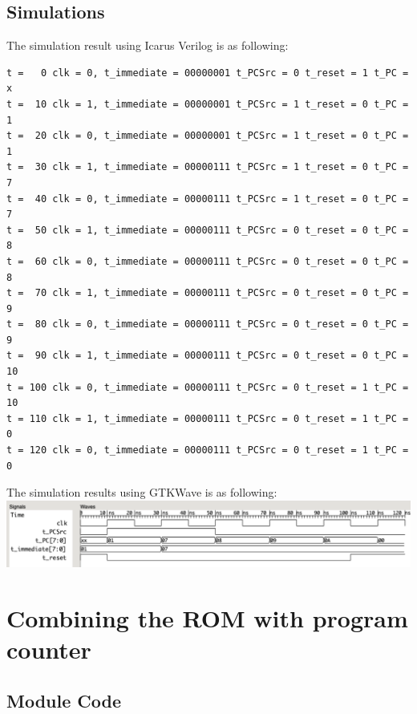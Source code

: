\documentclass{article}
\begin{document}
\subsection{Simulations}
The simulation result using Icarus Verilog is as following:
\begin{Verbatim}
t =   0 clk = 0, t_immediate = 00000001 t_PCSrc = 0 t_reset = 1 t_PC =   x
t =  10 clk = 1, t_immediate = 00000001 t_PCSrc = 1 t_reset = 0 t_PC =   1
t =  20 clk = 0, t_immediate = 00000001 t_PCSrc = 1 t_reset = 0 t_PC =   1
t =  30 clk = 1, t_immediate = 00000111 t_PCSrc = 1 t_reset = 0 t_PC =   7
t =  40 clk = 0, t_immediate = 00000111 t_PCSrc = 1 t_reset = 0 t_PC =   7
t =  50 clk = 1, t_immediate = 00000111 t_PCSrc = 0 t_reset = 0 t_PC =   8
t =  60 clk = 0, t_immediate = 00000111 t_PCSrc = 0 t_reset = 0 t_PC =   8
t =  70 clk = 1, t_immediate = 00000111 t_PCSrc = 0 t_reset = 0 t_PC =   9
t =  80 clk = 0, t_immediate = 00000111 t_PCSrc = 0 t_reset = 0 t_PC =   9
t =  90 clk = 1, t_immediate = 00000111 t_PCSrc = 0 t_reset = 0 t_PC =  10
t = 100 clk = 0, t_immediate = 00000111 t_PCSrc = 0 t_reset = 1 t_PC =  10
t = 110 clk = 1, t_immediate = 00000111 t_PCSrc = 0 t_reset = 1 t_PC =   0
t = 120 clk = 0, t_immediate = 00000111 t_PCSrc = 0 t_reset = 1 t_PC =   0
\end{Verbatim}
The simulation results using GTKWave is as following:\vspace{5pt}\\
\includegraphics[width=\textwidth]{pc.png}

\newpage
\section{Combining the ROM with program counter}
\subsection{Module Code}
\end{document}

